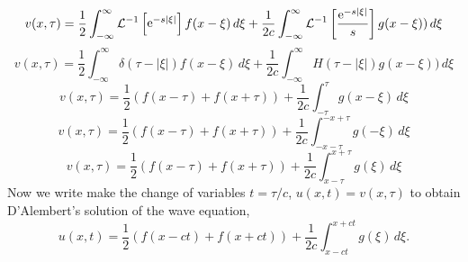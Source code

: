 {\begin{Solution}
\[  \]
  \[
  v(x,\tau) = \frac{1}{2} \int_{-\infty}^\infty \mathcal{L}^{-1}\left[\mathop{\mathrm{e}}\nolimits^{-s|\xi|}\right] 
  f(x-\xi) \,d\xi +
  \frac{1}{2c} \int_{-\infty}^\infty \mathcal{L}^{-1}\left[\frac{\mathop{\mathrm{e}}\nolimits^{-s|\xi|}}{s}\right] 
  g(x-\xi)) \,d\xi
  \]
  \[
  v(x,\tau) = \frac{1}{2} \int_{-\infty}^\infty \delta(\tau-|\xi|) f(x-\xi) \,d\xi +
  \frac{1}{2c} \int_{-\infty}^\infty H(\tau-|\xi|) g(x-\xi)) \,d\xi
  \]
  \[ 
  v(x,\tau) = \frac{1}{2}(f(x-\tau)+f(x+\tau)) + 
  \frac{1}{2c} \int_{-\tau}^{\tau} g(x-\xi) \,d\xi
  \]
  \[ 
  v(x,\tau) = \frac{1}{2}(f(x-\tau)+f(x+\tau)) + 
  \frac{1}{2c} \int_{-x-\tau}^{-x+\tau} g(-\xi) \,d\xi
  \]
  \[ 
  v(x,\tau) = \frac{1}{2}(f(x-\tau)+f(x+\tau)) + 
  \frac{1}{2c} \int_{x-\tau}^{x+\tau} g(\xi) \,d\xi
  \]
  Now we write make the change of variables $t = \tau/c$, $u(x,t)=v(x,\tau)$
  to obtain D'Alembert's solution of the wave equation,
  \[
  \boxed{
    u(x,t) = \frac{1}{2} (f(x - ct) + f(x + ct))
    + \frac{1}{2c} \int_{x-ct}^{x+ct} g(\xi)\,d\xi.
    }
  \]
\end{Solution}




}
